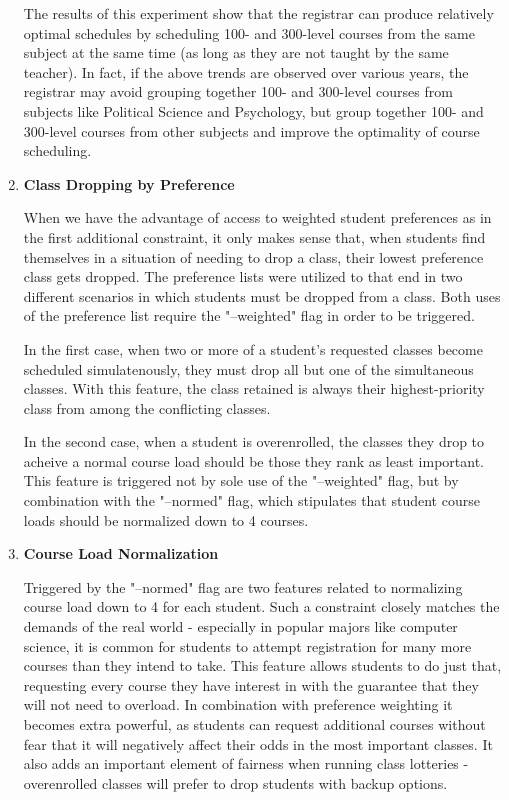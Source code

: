 \documentclass[11pt, oneside]{article}   	%
\begin{document}
\begin{enumerate}
The results of this experiment show that the registrar can produce relatively optimal schedules by scheduling 100- and 300-level courses from the same subject at the same time (as long as they are not taught by the same teacher). In fact, if the above trends are observed over various years, the registrar may avoid grouping together 100- and 300-level courses from subjects like Political Science and Psychology, but group together 100- and 300-level courses from other subjects and improve the optimality of course scheduling.\\

\item{\textbf{Class Dropping by Preference}}

When we have the advantage of access to weighted student preferences as in the first additional constraint, it only makes sense that, when students find themselves in a situation of needing to drop a class, their lowest preference class gets dropped. The preference lists were utilized to that end in two different scenarios in which students must be dropped from a class. Both uses of the preference list require the "--weighted" flag in order to be triggered. 

In the first case, when two or more of a student's requested classes become scheduled simulatenously, they must drop all but one of the simultaneous classes. With this feature, the class retained is always their highest-priority class from among the conflicting classes.

In the second case, when a student is overenrolled, the classes they drop to acheive a normal course load should be those they rank as least important. This feature is triggered not by sole use of the "--weighted" flag, but by combination with the "--normed" flag, which stipulates that student course loads should be normalized down to 4 courses.

\item{\textbf{Course Load Normalization}}

Triggered by the "--normed" flag are two features related to normalizing course load down to 4 for each student. Such a constraint closely matches the demands of the real world - especially in popular majors like computer science, it is common for students to attempt registration for many more courses than they intend to take. This feature allows students to do just that, requesting every course they have interest in with the guarantee that they will not need to overload. In combination with preference weighting it becomes extra powerful, as students can request additional courses without fear that it will negatively affect their odds in the most important classes. It also adds an important element of fairness when running class lotteries - overenrolled classes will prefer to drop students with backup options.


\end{enumerate}
\end{document}
